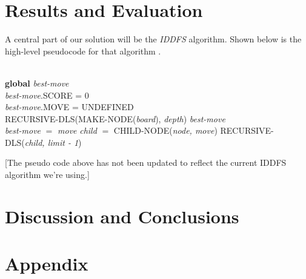 \documentclass[a4paper,11pt]{article}
\begin{document}
\section{Results and Evaluation}

A central part of our solution will be the \emph{IDDFS} algorithm.
Shown below is the
high-level pseudocode for that algorithm \cite{aimodern}.\\
\begin{algorithmic}
 \\
\textbf{global} \emph{best-move} \\
\emph{best-move}.SCORE = 0 \\
\emph{best-move}.MOVE = UNDEFINED \\
\State RECURSIVE-DLS(MAKE-NODE(\emph{board}), \emph{depth})
\State \Return \emph{best-move}
\EndIf
\EndFor
\EndFunction
\\
\State \emph{best-move} $=$ \emph{move}
\EndIf
\State \emph{child} $=$ CHILD-NODE(\emph{node, move})
\State RECURSIVE-DLS(\emph{child, limit - 1})
\EndFor
\EndIf
\EndFunction
\end{algorithmic}

[The pseudo code above has not been updated to reflect the current
  IDDFS algorithm we're using.]

\section{Discussion and Conclusions}




\section{Appendix}
\end{document}
